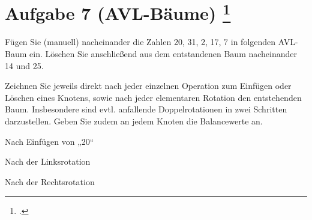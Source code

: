 \documentclass{lehramt-informatik-aufgabe}
\begin{document}
\section{Aufgabe 7 (AVL-Bäume)
\footcite{66115:2019:09}}

Fügen Sie (manuell) nacheinander die Zahlen 20, 31, 2, 17, 7 in
folgenden AVL-Baum ein. Löschen Sie anschließend aus dem entstandenen
Baum nacheinander 14 und 25.

\begin{center}
\end{center}

\noindent
Zeichnen Sie jeweils direkt nach jeder einzelnen Operation zum Einfügen
oder Löschen eines Knotens, sowie nach jeder elementaren Rotation den
entstehenden Baum. Insbesondere sind evtl. anfallende Doppelrotationen
in zwei Schritten darzustellen. Geben Sie zudem an jedem Knoten die
Balancewerte an.

\begin{liDiagramm}{Nach Einfügen von „20“}
\end{liDiagramm}

\begin{liDiagramm}{Nach der Linksrotation}
\end{liDiagramm}

\begin{liDiagramm}{Nach der Rechtsrotation}
\end{liDiagramm}
\end{document}
